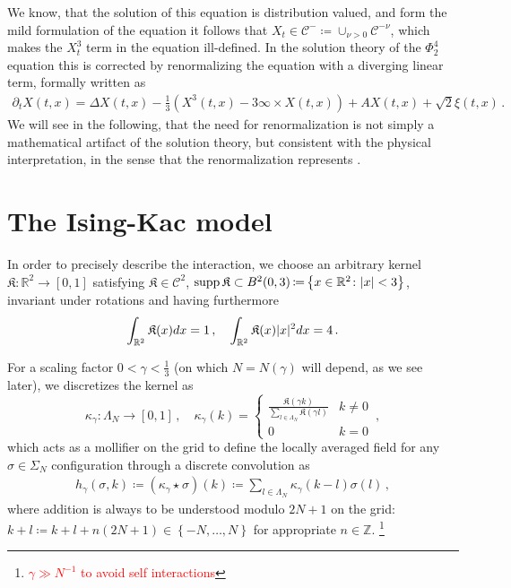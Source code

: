 \documentclass{report}
\newcommand{\ZZ}{\mathbb{Z}}
\newcommand{\RR}{\mathbb{R}}
\DeclarePairedDelimiter\abs{\lvert}{\rvert} %
\newcommand{\Convolve}[3][]{#2 \star_{#1} #3}
\DeclareMathOperator{\DefiningEquality}{\coloneqq}
\DeclareMathOperator{\Union}{\cup}
\DeclareMathOperator{\Support}{supp}
\theoremstyle{remark}
\theoremstyle{definition}
\begin{document}
We know, that the solution of this equation is distribution valued, and form the mild formulation of the equation it follows that $X_t \in \mathcal{C}^- \DefiningEquality \Union_{\nu > 0} \mathcal{C}^{-\nu}$, which makes the $X_t^3$ term in the equation ill-defined. In the solution theory of the $\Phi^4_2$ equation this is corrected by renormalizing the equation with a diverging linear term, formally written as 
\begin{align}
  \partial_t X(t, x) = \Delta X(t, x) - \frac{1}{3}\left(X^3(t, x) - 3 \infty \times X(t, x)\right) + A X(t, x) + \sqrt{2}\xi(t, x)\,.
\end{align}
We will see in the following, that the need for renormalization is not simply a mathematical artifact of the solution theory, but consistent with the physical interpretation, in the sense that the renormalization represents  \cite{mourrat2015convergencetwodimensionaldynamicisingkac}.

\section{The Ising-Kac model}
In order to precisely describe the interaction, we choose an arbitrary kernel $\mathfrak{K}: \RR^2 \to [0, 1]$ satisfying $\mathfrak{K} \in \mathcal{C}^2$, $\Support{\mathfrak{K}} \subset B^2(0, 3) \DefiningEquality \left\{x \in \RR^2 \colon \abs{x} < 3\right\}$, invariant under rotations and having furthermore $$\int_{\RR^2} \mathfrak{K}(x) dx = 1\,,\quad \int_{\RR^2} \mathfrak{K}(x) \abs{x}^2 dx = 4\,.$$


For a scaling factor $0 < \gamma < \frac{1}{3}$ (on which $N = N(\gamma)$ will depend, as we see later), we discretizes the kernel as 
$$\kappa_\gamma: \Lambda_N \to [0, 1]\,,\quad\kappa_\gamma(k) = \begin{cases}
  \frac{\mathfrak{K}(\gamma k)}{\sum_{l \in \Lambda_N} \mathfrak{K}(\gamma l)}&k \neq 0\\
  0 & k = 0
\end{cases}\,,$$
which acts as a mollifier on the grid to define the locally averaged field for any $\sigma \in \Sigma_N$ configuration through a discrete convolution as \begin{align}
  h_\gamma(\sigma, k) \DefiningEquality (\Convolve{\kappa_\gamma}{\sigma})(k) \DefiningEquality  \sum_{l\in \Lambda_N} \kappa_\gamma(k-l) \sigma(l)\,,
\end{align}
where addition is always to be understood modulo $2N + 1$ on the grid: $k + l \DefiningEquality k + l + n(2N + 1) \in \left\{-N, \ldots, N\right\}$ for appropriate $n \in \ZZ$. \footnote{\textcolor{red}{$\gamma \gg N^{-1}$ to avoid self interactions}}
\end{document}
